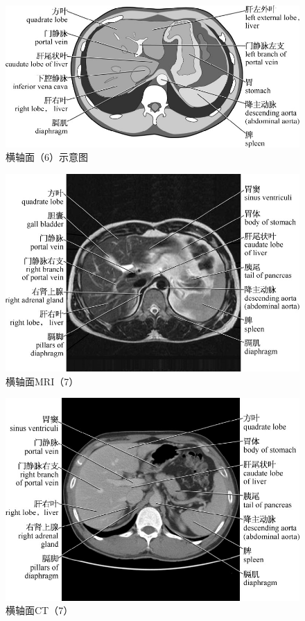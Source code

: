 \begin{figure}[!htbp]
 \centering
 \includegraphics{./images/Image00019.jpg}
 \captionsetup{justification=centering}
 \caption{横轴面（6）示意图}
  \end{figure} 
 \FloatBarrier

\begin{figure}[!htbp]
 \centering
 \includegraphics{./images/Image00020.jpg}
 \captionsetup{justification=centering}
 \caption{横轴面MRI（7）}
  \end{figure} 
 \FloatBarrier

\begin{figure}[!htbp]
 \centering
 \includegraphics{./images/Image00021.jpg}
 \captionsetup{justification=centering}
 \caption{横轴面CT（7）}
  \end{figure} 
 \FloatBarrier

